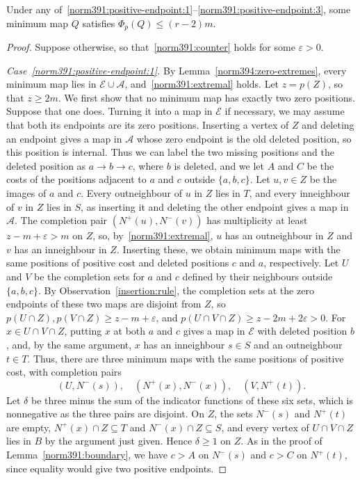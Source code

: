 \begin{lemma}
\label{norm391:positive-endpoint}\label{norm391:weak-endpoint}\label{norm391:zero-endpoint}
Under any of~\ref{norm391:positive-endpoint:1}--\ref{norm391:positive-endpoint:3}, some minimum map $Q$ satisfies $\Phi_p(Q)\le(r-2)m$.
\end{lemma}
\begin{proof}
Suppose otherwise, so that~\eqref{norm391:counter} holds for some $\varepsilon>0$.

\emph{Case~\ref{norm391:positive-endpoint:1}.}
By Lemma~\ref{norm394:zero-extremes}, every minimum map lies in $\mathcal E\cup\mathcal A$, and~\eqref{norm391:extremal} holds. Let $z=p(Z)$, so that $z\ge2m$.
We first show that no minimum map has exactly two zero positions. Suppose that one does. Turning it into a map in $\mathcal E$ if necessary, we may assume that both its endpoints are its zero positions. Inserting a vertex of $Z$ and deleting an endpoint gives a map in $\mathcal A$ whose zero endpoint is the old deleted position, so this position is internal. Thus we can label the two missing positions and the deleted position as $a\to b\to c$, where $b$ is deleted, and we let $A$ and $C$ be the costs of the positions adjacent to $a$ and $c$ outside $\{a,b,c\}$.
Let $u,v\in Z$ be the images of $a$ and $c$. Every outneighbour of $u$ in $Z$ lies in $T$, and every inneighbour of $v$ in $Z$ lies in $S$, as inserting it and deleting the other endpoint gives a map in $\mathcal A$. The completion pair $(N^+(u),N^-(v))$ has multiplicity at least $z-m+\varepsilon>m$ on $Z$, so, by~\eqref{norm391:extremal}, $u$ has an outneighbour in $Z$ and $v$ has an inneighbour in $Z$. Inserting these, we obtain minimum maps with the same positions of positive cost and deleted positions $c$ and $a$, respectively.
Let $U$ and $V$ be the completion sets for $a$ and $c$ defined by their neighbours outside $\{a,b,c\}$. By Observation~\ref{insertion:rule}, the completion sets at the zero endpoints of these two maps are disjoint from $Z$, so $p(U\cap Z),p(V\cap Z)\ge z-m+\varepsilon$, and
$p(U\cap V\cap Z)\ge z-2m+2\varepsilon>0$.
For $x\in U\cap V\cap Z$, putting $x$ at both $a$ and $c$ gives a map in $\mathcal E$ with deleted position $b$, and, by the same argument, $x$ has an inneighbour $s\in S$ and an outneighbour $t\in T$.
Thus, there are three minimum maps with the same positions of positive cost, with completion pairs
\[
 (U,N^-(s)),\quad(N^+(x),N^-(x)),\quad(V,N^+(t)).
\]
Let $\delta$ be three minus the sum of the indicator functions of these six sets, which is nonnegative as the three pairs are disjoint.
On $Z$, the sets $N^-(s)$ and $N^+(t)$ are empty, $N^+(x)\cap Z\subseteq T$ and $N^-(x)\cap Z\subseteq S$, and every vertex of $U\cap V\cap Z$ lies in $B$ by the argument just given. Hence $\delta\ge1$ on $Z$.
As in the proof of Lemma~\ref{norm391:boundary}, we have $c>A$ on $N^-(s)$ and $c>C$ on $N^+(t)$, since equality would give two positive endpoints.


\end{proof}
